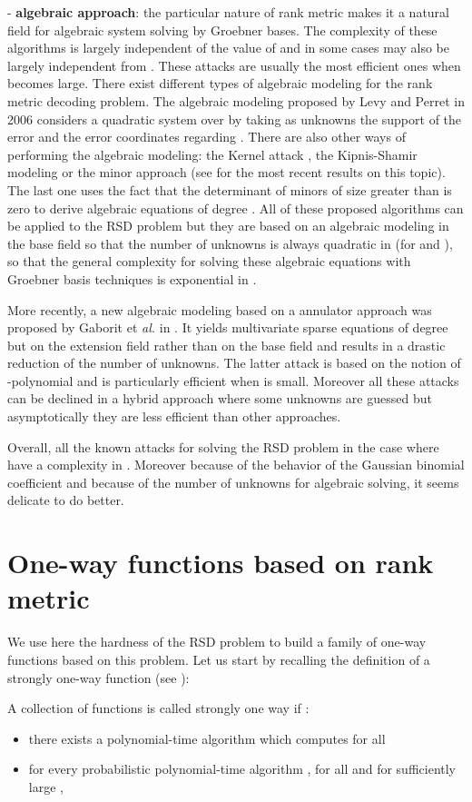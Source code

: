 \documentclass[11pt, a4paper]{llncs}
\begin{document}
- {\bf algebraic approach}: the particular nature of rank metric makes it a natural field
for algebraic system solving  by Groebner bases. The complexity of these algorithms
is largely independent of the value of 
and in some cases may also be largely independent from .
These attacks are usually the most efficient ones when  becomes large.
There exist different types of algebraic modeling for the rank metric decoding problem. 
The algebraic modeling proposed by Levy and Perret \cite{LP06} in 2006 
considers a quadratic system over  
by taking as unknowns the support  of the error and the error
coordinates regarding . There are also other  ways of performing the algebraic modeling:  
the Kernel attack  \cite{C01,GC00},  the Kipnis-Shamir modeling \cite{KS99} or the minor approach
(see \cite{S12} for the most recent results on this topic). 
The last one uses the fact that the determinant of minors of size greater than 
is zero to derive algebraic equations of degree . All of these proposed algorithms can be applied
to  the RSD problem but they are based on an algebraic modeling in the base field 
so that the number of unknowns is always quadratic in  (for 
and  ), so that the general complexity for solving these algebraic equations with Groebner basis techniques
is exponential in .

More recently, a new algebraic modeling based on a  annulator approach was proposed by Gaborit et {\it al.} in \cite{GRS13}.
It yields multivariate sparse equations of degree  but on the extension field
 rather than on the base field  and results in a drastic reduction of the number of 
unknowns. The latter attack is based on the
notion of -polynomial and is particularly efficient when  is small.
Moreover all these attacks can be declined in a hybrid approach where some
unknowns are guessed but asymptotically they are less efficient than other approaches.


Overall, all the known attacks for solving the RSD problem in the case where 
 have a complexity in . Moreover because of the behavior of the Gaussian
binomial coefficient and because of the number of unknowns for algebraic solving, it seems
delicate to do better. 
\section{One-way functions based on rank metric}

We use here the hardness of the RSD problem to build a family of
one-way functions based on this problem. Let us start by recalling the definition of a strongly one-way function (see \cite[Definition 1]{FS96}):
\begin{definition}
A collection of functions  is called strongly one way if :
\begin{itemize}
\item there exists a polynomial-time algorithm which  computes  for all 
\item for every probabilistic polynomial-time algorithm , for all  and for sufficiently large , 
\end{itemize}
\end{definition}
\end{document}
